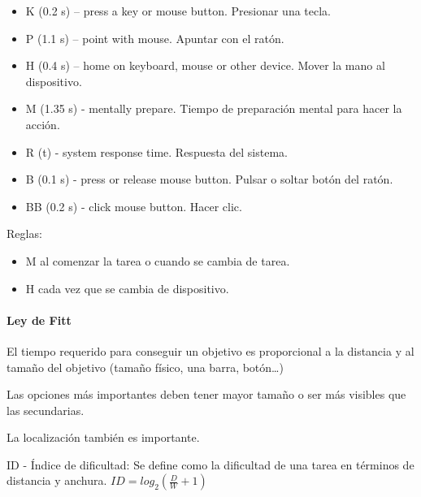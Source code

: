 \documentclass[12pt, twoside, openright]{report} %
\begin{document}
          \begin{itemize}
          
          \item
            K (0.2 s) -- press a key or mouse button. Presionar una
            tecla.
          \item
            P (1.1 s) -- point with mouse. Apuntar con el ratón.
          \item
            H (0.4 s) -- home on keyboard, mouse or other device. Mover
            la mano al dispositivo.
          \item
            M (1.35 s) - mentally prepare. Tiempo de preparación mental
            para hacer la acción.
          \item
            R (t) - system response time. Respuesta del sistema.
          \item
            B (0.1 s) - press or release mouse button. Pulsar o soltar
            botón del ratón.
          \item
            BB (0.2 s) - click mouse button. Hacer clic.
          \end{itemize}

          Reglas:

          \begin{itemize}
          
          \item
            M al comenzar la tarea o cuando se cambia de tarea.
          \item
            H cada vez que se cambia de dispositivo.
          \end{itemize}

\paragraph{Ley de Fitt}
        El tiempo requerido para conseguir un objetivo es
        proporcional a la distancia y al tamaño del objetivo (tamaño
        físico, una barra, botón\ldots)


        
          Las opciones más importantes deben tener mayor tamaño o ser
          más visibles que las secundarias.

          La localización también es importante.

          ID - Índice de dificultad: Se define como la dificultad de una
          tarea en términos de distancia y anchura.
          \(ID = log_2 ( \frac {D} {W} + 1)\)
\end{document}
